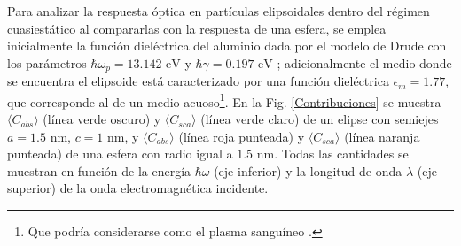 Para analizar la respuesta óptica en partículas elipsoidales dentro del régimen cuasiestático al compararlas con la respuesta de una esfera, se emplea inicialmente la función dieléctrica del aluminio dada por el modelo de Drude con los parámetros $\hbar\omega_p=13.142\text{ eV}$ y $\hbar\gamma=0.197\text{ eV}$ \cite{Aluminio}; adicionalmente el medio donde se encuentra el elipsoide está caracterizado por una función dieléctrica $\epsilon_m = 1.77$, que corresponde al de un medio acuoso\footnote{Que podría considerarse como el plasma sanguíneo \cite{Blood}.}. En la Fig. \ref{Contribuciones} se muestra $\langle C_{abs} \rangle$ (línea verde oscuro) y $\langle C_{sca} \rangle$ (línea verde claro) de  un elipse con semiejes $a=1.5\text{ nm}$, $c=1\text{ nm}$, y $\langle C_{abs} \rangle$ (línea roja punteada) y $\langle C_{sca} \rangle$ (línea naranja punteada) de una esfera con radio igual a $1.5\text{ nm}$. Todas las cantidades se muestran
en función de la energía $\hbar\omega$ (eje inferior) y la longitud de onda $\lambda$ (eje superior) de la onda electromagnética incidente. \\
